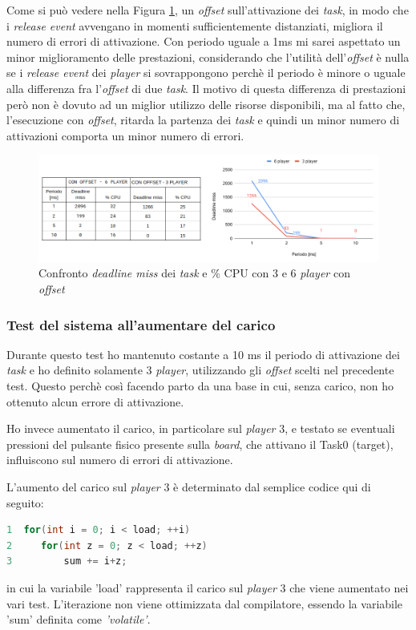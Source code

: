 \documentclass{article}
\begin{document}
Come si può vedere nella Figura \ref{noC-siO}, un \textit{offset} sull'attivazione dei \textit{task}, in modo che i \textit{release event} avvengano in momenti sufficientemente distanziati, migliora il numero di errori di attivazione. Con periodo uguale a 1ms mi sarei aspettato un minor miglioramento delle prestazioni, considerando che l'utilità dell'\textit{offset} è nulla se i \textit{release event} dei \textit{player} si sovrappongono perchè il periodo è minore o uguale alla differenza fra l'\textit{offset} di due \textit{task}. Il motivo di questa differenza di prestazioni però non è dovuto ad un miglior utilizzo delle risorse disponibili, ma al fatto che, l'esecuzione con \textit{offset}, ritarda la partenza dei \textit{task} e quindi un minor numero di attivazioni comporta un minor numero di errori.
\begin{figure}[H]
	\centering
	\includegraphics[width=6in]{image/NO_CARICO-OFFSET.png}
	\caption{Confronto \textit{deadline miss} dei \textit{task} e \% CPU con 3 e 6 \textit{player} con \textit{offset}}
	\label{noC-siO}
\end{figure}

\subsubsection{Test del sistema all'aumentare del carico}
Durante questo test ho mantenuto costante a 10 ms il periodo di attivazione dei \textit{task} e ho definito solamente 3 \textit{player}, utilizzando gli \textit{offset} scelti nel precedente test. Questo perchè così facendo parto da una base in cui, senza carico, non ho ottenuto alcun errore di attivazione.

Ho invece aumentato il carico, in particolare sul \textit{player} 3, e testato se eventuali pressioni del pulsante fisico presente sulla \textit{board}, che attivano il Task0 (target), influiscono sul numero di errori di attivazione.

L'aumento del carico sul \textit{player} 3 è determinato dal semplice codice qui di seguito:
\begin{lstlisting}[language=C]
1  for(int i = 0; i < load; ++i)
2	  for(int z = 0; z < load; ++z)
3		  sum += i+z;
\end{lstlisting}
in cui la variabile 'load' rappresenta il carico sul \textit{player} 3 che viene aumentato nei vari test.
L'iterazione non viene ottimizzata dal compilatore, essendo la variabile 'sum' definita come \textit{'volatile'}.
\end{document}
